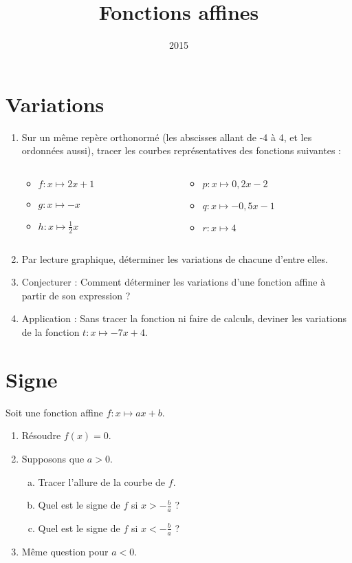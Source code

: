 \documentclass[14pt, aspectratio=34]{beamer}
\institute{Lycée Marie Curie}
\date{2015}
\title{Fonctions affines}
\begin{document}
\section{Variations}
\begin{frame}
  \begin{enumerate}
    \item Sur un même repère orthonormé (les abscisses allant de -4 à 4, et les ordonnées aussi), tracer les courbes représentatives
      des fonctions suivantes :
  \begin{columns}
    \begin{column}{.4\textwidth}
      \begin{itemize}
        \item $f:x\mapsto 2x+1$
        \item $g:x\mapsto -x$
        \item $h:x\mapsto \frac{1}{2}x$
      \end{itemize}
    \end{column}
    \begin{column}{.4\textwidth}
      \begin{itemize}
        \item $p:x\mapsto 0,2x-2$
        \item $q:x\mapsto -0,5x-1$
        \item $r:x\mapsto 4$
      \end{itemize}
    \end{column}
    \end{columns}

    \item Par lecture graphique, déterminer les variations de chacune d'entre
      elles.
    \item Conjecturer : Comment déterminer les variations d'une fonction
      affine à partir de son expression ?
    \item Application : Sans tracer la fonction ni faire de calculs, deviner
      les variations de la fonction $t:x\mapsto -7x+4$.
  \end{enumerate}
\end{frame}

\section{Signe}
\begin{frame}
  Soit une fonction affine $f:x\mapsto ax+b$.
  \begin{enumerate}
    \item Résoudre $f(x)=0$.
    \item Supposons que $a>0$.
      \begin{enumerate}[a.]
        \item Tracer l'allure de la courbe de $f$.
        \item Quel est le signe de $f$ si $x>-\frac{b}{a}$ ?
        \item Quel est le signe de $f$ si $x<-\frac{b}{a}$ ?
      \end{enumerate}
    \item Même question pour $a<0$.
  \end{enumerate}
  
\end{frame}
\end{document}
